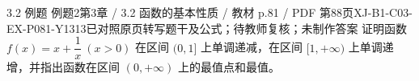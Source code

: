 \par\noindent\begin{minipage}{\linewidth}
\begin{bankitem}{3.2 例题 例题2}{第3章 / 3.2 函数的基本性质 / 教材 p.81 / PDF 第88页}{XJ-B1-C03-EX-P081-Y1313}{已对照原页转写题干及公式；待教师复核；未制作答案}
证明函数 $f(x)=x+\dfrac1x\ (x>0)$ 在区间 $(0,1]$ 上单调递减，在区间 $[1,+\infty)$ 上单调递增，并指出函数在区间 $(0,+\infty)$ 上的最值点和最值。
\end{bankitem}
\end{minipage}\par\medskip
